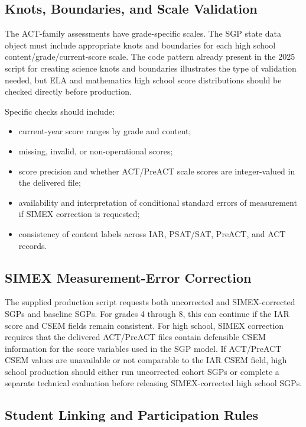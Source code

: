 \documentclass[11pt]{article}
\begin{document}
\subsection{Knots, Boundaries, and Scale Validation}

The ACT-family assessments have grade-specific scales. The SGP state data object must include appropriate knots and boundaries for each high school content/grade/current-score scale. The code pattern already present in the 2025 script for creating science knots and boundaries illustrates the type of validation needed, but ELA and mathematics high school score distributions should be checked directly before production.

Specific checks should include:

\begin{itemize}
\item current-year score ranges by grade and content;
\item missing, invalid, or non-operational scores;
\item score precision and whether ACT/PreACT scale scores are integer-valued in the delivered file;
\item availability and interpretation of conditional standard errors of measurement if SIMEX correction is requested;
\item consistency of content labels across IAR, PSAT/SAT, PreACT, and ACT records.
\end{itemize}

\subsection{SIMEX Measurement-Error Correction}

The supplied production script requests both uncorrected and SIMEX-corrected SGPs and baseline SGPs. For grades 4 through 8, this can continue if the IAR score and CSEM fields remain consistent. For high school, SIMEX correction requires that the delivered ACT/PreACT files contain defensible CSEM information for the score variables used in the SGP model. If ACT/PreACT CSEM values are unavailable or not comparable to the IAR CSEM field, high school production should either run uncorrected cohort SGPs or complete a separate technical evaluation before releasing SIMEX-corrected high school SGPs.

\subsection{Student Linking and Participation Rules}
\end{document}
